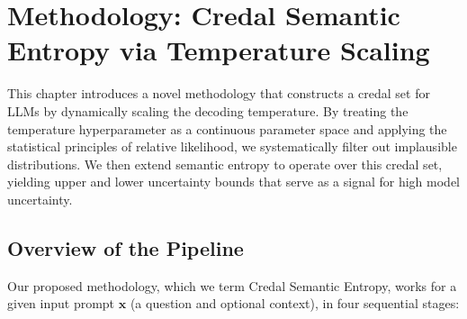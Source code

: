 %
\chapter{Methodology: Credal Semantic Entropy via Temperature Scaling}
\label{sec:methodology}
This chapter introduces a novel methodology that constructs a 
credal set for LLMs by dynamically scaling the decoding temperature.
By treating the temperature hyperparameter as a continuous parameter 
space and applying the statistical principles of relative likelihood,
we systematically filter out implausible distributions. We then 
extend semantic entropy to operate over this credal set, yielding
upper and lower uncertainty bounds that serve as a signal 
for high model uncertainty.

\section{Overview of the Pipeline}
\label{sec:methodology:overview}
Our proposed methodology, which we term Credal Semantic Entropy,
works for a given input prompt $\mathbf{x}$ (a question and optional context),
in four sequential stages:

